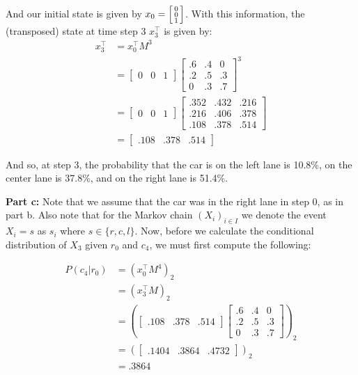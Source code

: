 \documentclass{article}
\newcommand{\icol}[1]{%
  \begin{bsmallmatrix}#1\end{bsmallmatrix}%
}
\begin{document}
And our initial state is given by $x_0=\icol{0\\0\\1}$. With this information, the (transposed) state at time step 3 $x_3^\top$ is given by:
\begin{align*}
  x_3^\top&=x_0^\top M^3\\
  &=\begin{bmatrix}
    0&0&1
  \end{bmatrix}\begin{bmatrix}
    .6&.4&0\\.2&.5&.3\\0&.3&.7
  \end{bmatrix}^3\\
  &=\begin{bmatrix}
    0&0&1
  \end{bmatrix}\begin{bmatrix}
    .352&.432&.216\\.216&.406&.378\\.108&.378&.514
  \end{bmatrix}\\
  &=\begin{bmatrix}
    .108&.378&.514
  \end{bmatrix}
\end{align*}

And so, at step 3, the probability that the car is on the left lane is 10.8\%, on the center lane is 37.8\%, and on the right lane is 51.4\%.
\bigskip

\noindent\textbf{Part c:} Note that we assume that the car was in the right lane in step 0, as in part b. Also note that for the Markov chain $(X_i)_{i\in I}$ we denote the event $X_i=s$ as $s_i$ where $s\in\{r,c,l\}$. Now, before we calculate the conditional distribution of $X_3$ given $r_0$ and $c_4$, we must first compute the following:

\begin{align*}
  P(c_4|r_0)&=(x_0^\top M^4)_2\tag{distr. of Markov chain}\\
  &=(x_3^\top M)_2\tag{$x_i^\top:=x_0^\top M^i$}\\
  &=\left(\begin{bmatrix}
    .108&.378&.514
  \end{bmatrix}\begin{bmatrix}
    .6&.4&0\\.2&.5&.3\\0&.3&.7
  \end{bmatrix}\right)_2\\
  &=\left(\begin{bmatrix}
    .1404&.3864&.4732
  \end{bmatrix}\right)_2\\
  &=.3864
\end{align*}
\end{document}
